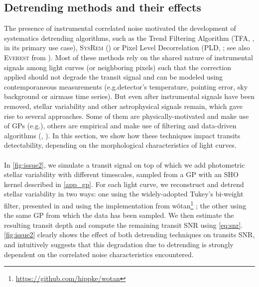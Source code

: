 \documentclass[modern]{aastex631}
\begin{document}
\subsection{Detrending methods and their effects}\label{detrending_effect}
The presence of instrumental correlated noise motivated the development of systematics detrending algorithms, such as the Trend Filtering Algorithm (\textsc{TFA}, \citealt{tfa}, in its primary use case), \textsc{SysRem} (\citealt{sysrem}) or Pixel Level Decorrelation (\textsc{PLD}, \citealt{pld}; see also \textsc{Everest} from \citealt{everest1, everest2}). Most of these methods rely on the shared nature of instrumental signals among light curves (or neighboring pixels) such that the correction applied should not degrade the transit signal and can be modeled using contemporaneous measurements (e.g.\;detector's temperature, pointing error, sky background or airmass time series). But even after instrumental signals have been removed, stellar variability and other astrophysical signals remain, which gave rise to several approaches. Some of them are physically-motivated and make use of GPs (e.g.\;\citealt{k2sc}), others are empirical and make use of filtering and data-driven algorithms (\citealt{Jenkins2010}, \citealt{wotan}). In this section, we show how these techniques impact transits detectability, depending on the morphological characteristics of light curves.\\\\
In \autoref{fig:issue2}, we simulate a transit signal on top of which we add photometric stellar variability with different timescales, sampled from a GP with an SHO kernel described in \autoref{app_gp}. For each light curve, we reconstruct and detrend stellar variability in two ways: one using the widely-adopted Tukey's bi-weight filter, presented in \cite{tukey} and using the implementation from \textsf{wõtan}\footnote{\href{https://github.com/hippke/wotan}{https://github.com/hippke/wotan}} \citep{wotan}; the other using the same GP from which the data has been sampled. We then estimate the resulting transit depth and compute the remaining transit SNR using \autoref{eq:snr}. \autoref{fig:issue2} clearly shows the effect of both detrending techniques on transits SNR, and intuitively suggests that this degradation due to detrending is strongly dependent on the correlated noise characteristics encountered.
\end{document}
